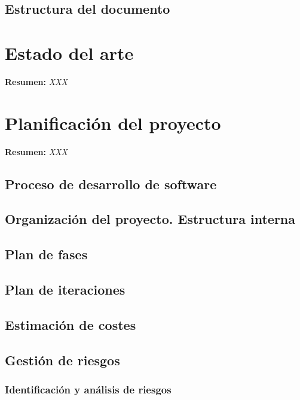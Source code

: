 \documentclass[12pt,a4paper, twoside]{report}
\begin{document}
	\section{Estructura del documento}
	
	\chapter{Estado del arte} \label{stateArtChapter}
	\textbf{Resumen:} \textit{XXX}
	
	\chapter{Planificación del proyecto} \label{planningChapter}
	\textbf{Resumen:} \textit{XXX}
	
	\section{Proceso de desarrollo de software}
	
	\section{Organización del proyecto. Estructura interna}
	
	\section{Plan de fases}
	
	\section{Plan de iteraciones}
	
	\section{Estimación de costes}
	
	\section{Gestión de riesgos}
	
	\subsection{Identificación y análisis de riesgos}
		
\end{document}
